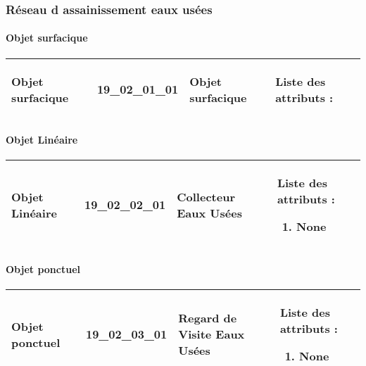 \documentclass[12pt,titlepage,oneside]{book}
\begin{document}
\subsubsection{\large Réseau d assainissement eaux usées}
\paragraph{Objet surfacique}
\noindent
\vspace{\baselineskip}

\renewcommand{\arraystretch}{1.2}
\begin{supertabular}{|p{10cm}|c|p{13cm}|p{12cm}|}
 Objet surfacique & 19\_02\_01\_01 & Objet surfacique & Liste des attributs :
\begin{enumerate}
\end{enumerate}
\\
\hline
\end{supertabular}
\begin{figure}[h!]
  \hfill         %
\end{figure}


\paragraph{Objet Linéaire}
\noindent
\vspace{\baselineskip}

\renewcommand{\arraystretch}{1.2}
\begin{supertabular}{|p{10cm}|c|p{13cm}|p{12cm}|}
 Objet Linéaire & 19\_02\_02\_01 & Collecteur Eaux Usées & Liste des attributs :
\begin{enumerate}
  \item None\end{enumerate}
\\
\hline
\end{supertabular}
\begin{figure}[h!]
  \hfill         %
\end{figure}


\paragraph{Objet ponctuel}
\noindent
\vspace{\baselineskip}

\renewcommand{\arraystretch}{1.2}
\begin{supertabular}{|p{10cm}|c|p{13cm}|p{12cm}|}
 Objet ponctuel & 19\_02\_03\_01 & Regard de Visite Eaux Usées & Liste des attributs :
\begin{enumerate}
  \item None\end{enumerate}
\\
\hline
\end{supertabular}
\begin{figure}[h!]
  \hfill         %
\end{figure}
\end{document}
